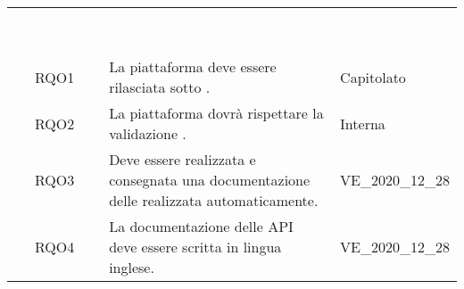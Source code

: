 \renewcommand{\arraystretch}{1.5}
\begin{longtable}{|c C{9.5cm} C{2.5cm}|} 
	
	\textcolor{white}{\textbf{Codice Requisito}}&
	\textcolor{white}{\textbf{Descrizione}}&
	\textcolor{white}{\textbf{Fonte}}\\	

	RQO1 & La piattaforma deve essere rilasciata sotto . & Capitolato  \\

	RQO2 & La piattaforma dovrà rispettare la validazione . & Interna \\
	
	RQO3 & Deve essere realizzata e consegnata una documentazione delle  realizzata automaticamente. & VE\_2020\_12\_28 \\
	
	RQO4 & La documentazione delle API deve essere scritta in lingua inglese. & VE\_2020\_12\_28 \\
	
\end{longtable}
